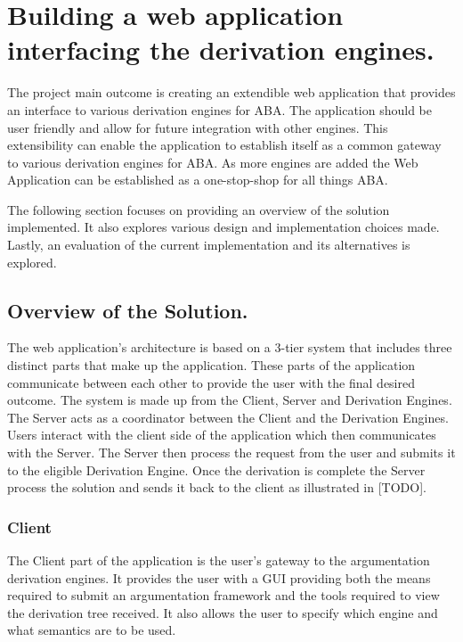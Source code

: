 \newpage

\chapter{Building a web application interfacing the derivation engines.}
The project main outcome is creating an extendible web application that provides an interface to various derivation engines for ABA. The application should be user friendly and allow for future integration with other engines. This extensibility can enable the application to establish itself as a common gateway to various derivation engines for ABA. As more engines are added the Web Application can be established as a one-stop-shop for all things ABA.

The following section focuses on providing an overview of the solution implemented. It also explores various design and implementation choices made. Lastly, an evaluation of the current implementation and its alternatives is explored.

\section{Overview of the Solution.}

The web application's architecture is based on a 3-tier system that includes three distinct parts that make up the application. These parts of the application communicate between each other to provide the user with the final desired outcome. 	The system is made up from the Client, Server and Derivation Engines. The Server acts as a coordinator between the Client and the Derivation Engines. Users interact with the client side of the application which then communicates with the Server. The Server then process the request from the user and submits it to the eligible Derivation Engine. Once the derivation is complete the Server process the solution and sends it back to the client as illustrated in [TODO].

\subsection{Client}

The Client part of the application is the user's gateway to the argumentation derivation engines. It provides the user with a GUI providing both the means required to submit an argumentation framework and  the tools required to view the derivation tree received. It also allows the user to specify which engine and what semantics are to be used.


